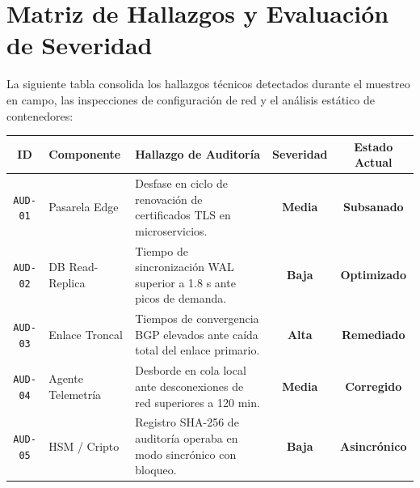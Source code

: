\documentclass[11pt,letterpaper]{article}
\begin{document}
\section{Matriz de Hallazgos y Evaluaci\'on de Severidad}

La siguiente tabla consolida los hallazgos t\'ecnicos detectados durante el muestreo en campo, las inspecciones de configuraci\'on de red y el an\'alisis est\'atico de contenedores:

\vspace{0.4em}

\noindent
\begin{tabularx}{\linewidth}{@{}c p{2.8cm} X c c@{}}
  \toprule
  \textbf{\color{corpPrimary}ID} & \textbf{\color{corpPrimary}Componente} & \textbf{\color{corpPrimary}Hallazgo de Auditor\'ia} & \textbf{\color{corpPrimary}Severidad} & \textbf{\color{corpPrimary}Estado Actual} \\
  \midrule
  \texttt{AUD-01} & Pasarela Edge & Desfase en ciclo de renovaci\'on de certificados TLS en microservicios. & \textbf{\color{corpWarning}Media} & \textbf{\color{corpSuccess}Subsanado} \\
  \addlinespace[3pt]
  \texttt{AUD-02} & DB Read-Replica & Tiempo de sincronizaci\'on WAL superior a 1.8 s ante picos de demanda. & \textbf{\color{corpWarning}Baja} & \textbf{\color{corpSuccess}Optimizado} \\
  \addlinespace[3pt]
  \texttt{AUD-03} & Enlace Troncal & Tiempos de convergencia BGP elevados ante ca\'ida total del enlace primario. & \textbf{\color{corpDanger}Alta} & \textbf{\color{corpSuccess}Remediado} \\
  \addlinespace[3pt]
  \texttt{AUD-04} & Agente Telemetr\'ia & Desborde en cola local ante desconexiones de red superiores a 120 min. & \textbf{\color{corpWarning}Media} & \textbf{\color{corpSuccess}Corregido} \\
  \addlinespace[3pt]
  \texttt{AUD-05} & HSM / Cripto & Registro SHA-256 de auditor\'ia operaba en modo sincr\'onico con bloqueo. & \textbf{\color{corpWarning}Baja} & \textbf{\color{corpSuccess}Asincr\'onico} \\
  \bottomrule
\end{tabularx}

\vspace{0.8em}
\end{document}
